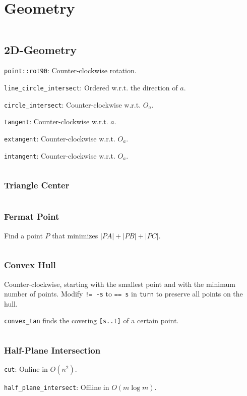 \chapter{Geometry}
\inputminted{c++}{401-geometry.cpp}

\section{2D-Geometry}
\begin{compactenum}
    \item \texttt{point::rot90}: Counter-clockwise rotation.
    \item \texttt{line\_circle\_intersect}: Ordered w.r.t. the direction of $a$.
    \item \texttt{circle\_intersect}: Counter-clockwise w.r.t. $O_a$.
    \item \texttt{tangent}: Counter-clockwise w.r.t. $a$.
    \item \texttt{extangent}: Counter-clockwise w.r.t. $O_a$.
    \item \texttt{intangent}: Counter-clockwise w.r.t. $O_a$.
\end{compactenum}
\inputminted{c++}{410-2d-geometry.cpp}

\subsection{Triangle Center}
\inputminted{c++}{413-triangle-center.cpp}

\subsection{Fermat Point}
Find a point $P$ that minimizes $|PA|+|PB|+|PC|$.
\inputminted{c++}{414-fermat-point.cpp}

\subsection{Convex Hull}
Counter-clockwise, starting with the smallest point and with the minimum number of points. Modify \texttt{!= -s} to \texttt{== s} in \texttt{turn} to preserve all points on the hull.

\texttt{convex\_tan} finds the covering \texttt{[s..t]} of a certain point. 
\inputminted{c++}{411-convex-hull.cpp}

\subsection{Half-Plane Intersection}
\begin{compactenum}
\item \texttt{cut}: Online in $O(n^2)$.
\item \texttt{half\_plane\_intersect}: Offline in $O(m\log m)$.
\end{compactenum}
\inputminted{c++}{412-half-plane-intersection.cpp}

